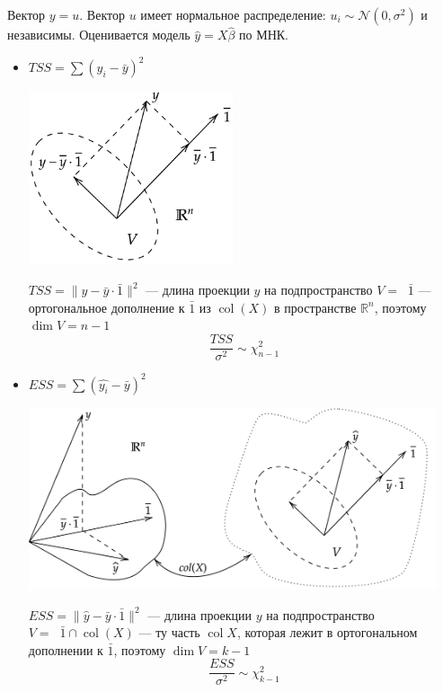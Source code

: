 \documentclass[12pt]{article} %
\theoremstyle{definition} %
\DeclareMathOperator{\Linp}{Lin^{\perp}}
\DeclareMathOperator{\col}{col}
\def \hb{\hat{\beta}}
\def \hy{\hat{y}}
\def \cN{\mathcal{N}}
\def \RR{\mathbb{R}}
\begin{document}
\begin{exerc}
    Вектор $y = u$. Вектор $u$ имеет нормальное распределение: $ u_i \sim \cN(0,\sigma^2)$ и независимы. Оценивается модель $\hy = X\hb$ по МНК.

    \begin{itemize}
        \item $TSS = \sum (y_i - \bar y)^2$
            \begin{center}
               \includegraphics[width=6cm]{images/pic07_06.png}
            \end{center}
            $TSS = \lVert y - \bar y \cdot \bar 1 \rVert^2$ — длина проекции $y$ на подпространство $V = \Linp \bar 1 $ — ортогональное дополнение к $\bar 1$ из $\col(X)$ в пространстве $\RR^n$, поэтому $\dim V =n-1$
            \[
            \frac{TSS}{\sigma^2} \sim \chi_{n-1}^2
            \]
        \newpage
        \item $ESS = \sum (\hat {y_i} - \bar y)^2$
            \begin{center}
               \includegraphics[width=12cm]{images/pic08_06.png}
            \end{center}
            $ESS = \lVert \hat y - \bar y \cdot \bar 1 \rVert^2$ — длина проекции $y$ на подпространство $V = \Linp \bar 1 \cap \col(X)$ — ту часть $\col X $, которая лежит в ортогональном дополнении к $\bar 1$, поэтому $\dim V =k-1$
            \[
            \frac{ESS}{\sigma^2} \sim \chi_{k-1}^2
            \]
    \end{itemize}
\end{exerc}
\end{document}

